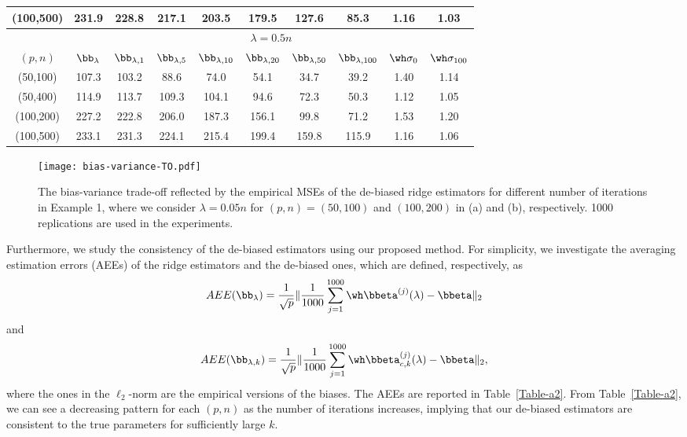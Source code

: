 \begin{table}[htp]
{\begin{center}
\begin{tabular}{cccccccccc}
(100,500)&231.9&228.8&217.1&203.5&179.5&127.6&85.3&1.16&1.03\\
\midrule
&\multicolumn{9}{c}{$\lambda=0.5n$}\\
\cline{2-10}
$(p,n)$&$\bb_{\lambda}$&$\bb_{\lambda,1}$&$\bb_{\lambda,5}$&$\bb_{\lambda,10}$&$\bb_{\lambda,20}$&$\bb_{\lambda,50}$&$\bb_{\lambda,100}$&$\wh\sigma_0$&$\wh\sigma_{100}$\\
\hline
(50,100)&107.3&103.2&88.6&74.0&54.1&34.7&39.2&1.40&1.14\\
(50,400)&114.9&113.7&109.3&104.1&94.6&72.3&50.3&1.12&1.05\\
(100,200)&227.2&222.8&206.0&187.3&156.1&99.8&71.2&1.53&1.20\\
(100,500)&233.1&231.3&224.1&215.4&199.4&159.8&115.9&1.16&1.06\\
\bottomrule
\end{tabular}
  \end{center}}
\end{table}

\begin{figure}[ht]
\begin{center}
{\texttt{[image: bias-variance-TO.pdf]}}
\caption{  The bias-variance trade-off reflected by the empirical MSEs of the de-biased ridge estimators for different number of iterations in Example 1, where we consider $\lambda=0.05n$ for $(p,n)=(50,100)$ and $(100,200)$ in (a) and (b), respectively.  1000 replications are used in the experiments.  }\label{fig-0}
\end{center}
\end{figure}



Furthermore, we study the consistency of the de-biased estimators using our proposed method. For simplicity, we investigate the averaging estimation errors (AEEs) of the ridge estimators and the de-biased ones, which are defined, respectively, as
\begin{equation}\label{aee0}
    AEE(\bb_\lambda)=\frac{1}{\sqrt{p}}\|\frac{1}{1000}\sum_{j=1}^{1000}\wh\bbeta^{(j)}(\lambda)-\bbeta\|_2
\end{equation}
and
\begin{equation}\label{aeek}
    AEE(\bb_{\lambda,k})=\frac{1}{\sqrt{p}}\|\frac{1}{1000}\sum_{j=1}^{1000}\wh\bbeta_{c,k}^{(j)}(\lambda)-\bbeta\|_2,
\end{equation}
where the ones in the $\ell_2$-norm are the empirical versions of the biases. The AEEs are reported in Table~\ref{Table-a2}.
From Table~\ref{Table-a2}, we can see a decreasing pattern for each $(p,n)$ as the number of iterations increases, implying that our de-biased estimators are consistent to the true parameters for sufficiently large $k$.







